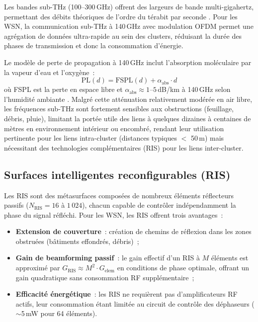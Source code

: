 Les bandes sub-THz (100--300\,GHz) offrent des largeurs de bande multi-gigahertz, permettant des débits théoriques de l'ordre du térabit par seconde \cite{saad2020vision6g}. Pour les WSN, la communication sub-THz à 140\,GHz avec modulation OFDM permet une agrégation de données ultra-rapide au sein des clusters, réduisant la durée des phases de transmission et donc la consommation d'énergie.

Le modèle de perte de propagation à 140\,GHz inclut l'absorption moléculaire par la vapeur d'eau et l'oxygène~:
\begin{equation}
    \text{PL}(d) = \text{FSPL}(d) + \alpha_{\text{abs}} \cdot d
\end{equation}
où FSPL est la perte en espace libre et $\alpha_{\text{abs}} \approx 1$--$5$\,dB/km à 140\,GHz selon l'humidité ambiante \cite{saad2020vision6g}. Malgré cette atténuation relativement modérée en air libre, les fréquences sub-THz sont fortement sensibles aux obstructions (feuillage, débris, pluie), limitant la portée utile des liens à quelques dizaines à centaines de mètres en environnement intérieur ou encombré, rendant leur utilisation pertinente pour les liens intra-cluster (distances typiques $<$ 50\,m) mais nécessitant des technologies complémentaires (RIS) pour les liens inter-cluster.

\subsection{Surfaces intelligentes reconfigurables (RIS)}

Les RIS sont des métasurfaces composées de nombreux éléments réflecteurs passifs ($N_{\text{RIS}} = 16$ à $1\,024$), chacun capable de contrôler indépendamment la phase du signal réfléchi. Pour les WSN, les RIS offrent trois avantages~:
\begin{itemize}
    \item \textbf{Extension de couverture}~: création de chemins de réflexion dans les zones obstruées (bâtiments effondrés, débris)~;
    \item \textbf{Gain de beamforming passif}~: le gain effectif d'un RIS à $M$ éléments est approximé par $G_{\text{RIS}} \approx M^2 \cdot G_{\text{elem}}$ en conditions de phase optimale, offrant un gain quadratique sans consommation RF supplémentaire~;
    \item \textbf{Efficacité énergétique}~: les RIS ne requièrent pas d'amplificateurs RF actifs, leur consommation étant limitée au circuit de contrôle des déphaseurs ($\sim$5\,mW pour 64 éléments).
\end{itemize}

